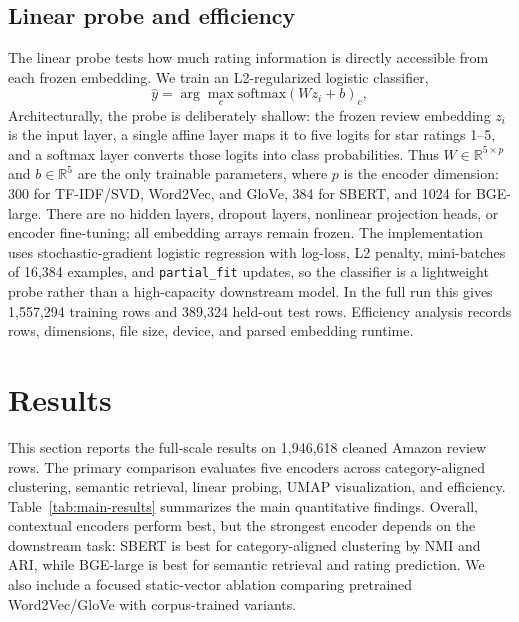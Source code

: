 \documentclass{article}
\begin{document}
\subsection{Linear probe and efficiency}
The linear probe tests how much rating information is directly accessible from each frozen embedding. We train an L2-regularized logistic classifier,
\begin{equation}
\hat{y}=\arg\max_c \mathrm{softmax}(Wz_i+b)_c,
\end{equation}
Architecturally, the probe is deliberately shallow: the frozen review embedding $z_i$ is the input layer, a single affine layer maps it to five logits for star ratings 1--5, and a softmax layer converts those logits into class probabilities. Thus $W \in \mathbb{R}^{5 \times p}$ and $b \in \mathbb{R}^{5}$ are the only trainable parameters, where $p$ is the encoder dimension: 300 for TF-IDF/SVD, Word2Vec, and GloVe, 384 for SBERT, and 1024 for BGE-large. There are no hidden layers, dropout layers, nonlinear projection heads, or encoder fine-tuning; all embedding arrays remain frozen. The implementation uses stochastic-gradient logistic regression with log-loss, L2 penalty, mini-batches of 16,384 examples, and \texttt{partial\_fit} updates, so the classifier is a lightweight probe rather than a high-capacity downstream model. In the full run this gives 1,557,294 training rows and 389,324 held-out test rows. Efficiency analysis records rows, dimensions, file size, device, and parsed embedding runtime.

\section{Results}

This section reports the full-scale results on 1,946,618 cleaned Amazon review rows. The primary comparison evaluates five encoders across category-aligned clustering, semantic retrieval, linear probing, UMAP visualization, and efficiency. Table~\ref{tab:main-results} summarizes the main quantitative findings. Overall, contextual encoders perform best, but the strongest encoder depends on the downstream task: SBERT is best for category-aligned clustering by NMI and ARI, while BGE-large is best for semantic retrieval and rating prediction. We also include a focused static-vector ablation comparing pretrained Word2Vec/GloVe with corpus-trained variants.
\end{document}
